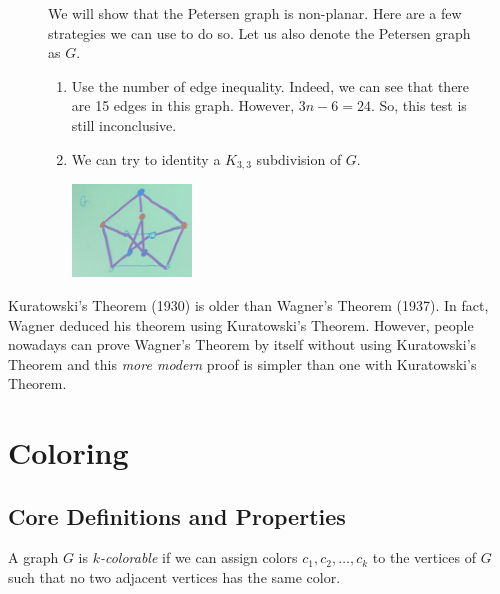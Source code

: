 \begin{figure}[ht]
\begin{nexample}
  We will show that the Petersen graph is non-planar. Here are a
  few strategies we can use to do so. Let us also denote the
  Petersen graph as \(G\).
  \begin{enumerate}
    \item Use the number of edge inequality. Indeed, we can see
      that there are 15 edges in this graph. However, \(3n-6 =
      24\). So, this test is still inconclusive.

    \item We can try to identity a \(K_{3, 3}\) subdivision of
      \(G\). 
      \begin{center}
        \includegraphics[width=0.3\textwidth]{figures/l14/petersen-k33}
      \end{center}
  \end{enumerate}
\end{nexample}
\end{figure}

\begin{distraction}
  Kuratowski's Theorem (1930) is older than Wagner's Theorem
  (1937). In fact, Wagner deduced his theorem using Kuratowski's
  Theorem. However, people nowadays can prove Wagner's Theorem by
  itself without using Kuratowski's Theorem and this \textit{more
  modern} proof is simpler than one with Kuratowski's Theorem.
\end{distraction}

\chapter{Coloring}

\section{Core Definitions and Properties}

\begin{definition}[\(k\)-colorable]
  A graph \(G\) is \textit{\(k\)-colorable} if we can assign 
  colors \(c_1, c_2, \ldots, c_k\) to the vertices of \(G\) such
  that no two adjacent vertices has the same color.
\end{definition}


